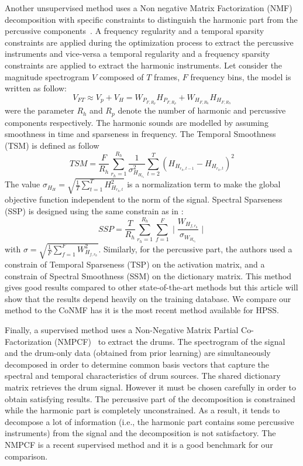 Another unsupervised method uses a Non negative Matrix Factorization (NMF) decomposition with specific constraints to distinguish the harmonic part from the percussive components~\cite{canadas2014percussive}. A frequency regularity and a temporal sparsity constraints are applied during the optimization process to extract the percussive instruments and vice-versa a temporal regularity and a frequency sparsity constraints are applied to extract the harmonic instruments. Let consider the magnitude spectrogram $V$ composed of $T$ frames, $F$ frequency bins, the model is written as follow:
$$ V_{FT} \approx V_p + V_H = W_{P_{F,R_p}} H_{P_{F,R_p}} + W_{H_{F,R_h}} H_{H_{F,R_h}} $$
were the parameter $R_h$ and $R_p$ denote the number of harmonic and percussive components respectively. The harmonic sounds are modelled by assuming smoothness in time and sparseness in frequency. The Temporal Smoothness (TSM) is defined as follow 
\begin{equation}\label{TSM}
TSM = \frac{F}{R_h} \sum_{r_h=1}^{R_h}\frac{1}{\sigma_{H_{H_{r_h}}}^2} \sum_{t=2}^{T}(H_{H_{r_h,t-1}} - H_{H_{r_h,t}})^2
\end{equation}
The value $\sigma_{H_{H}} = \sqrt{\frac{1}{T} \sum_{t=1}^{T} H_{H_{r_h,t}}^2 }$ is a normalization term to make the global objective function independent to the norm of the signal. Spectral Sparseness (SSP) is designed using the same constrain as in \cite{Virtanen}:
\begin{equation}\label{SSP}
SSP = \frac{T}{R_h} \sum_{r_h=1}^{R_h}\sum_{f=1}^{F} \mid\frac{W_{H_{f,r_h}}}{\sigma_{W_{H_{r_h}}}}\mid
\end{equation}
with $\sigma = \sqrt{\frac{1}{F} \sum_{f=1}^{F} W_{H_{f,r_h}}^2 }$.
Similarly, for the percussive part, the authors used a constrain of Temporal Sparseness (TSP) on the activation matrix, and a constrain of Spectral Smoothness (SSM) on the dictionary matrix. 
This method gives good results compared to other state-of-the-art methods but this article will show that the results depend heavily on the training database. We compare our method to the CoNMF has it is the most recent method available for HPSS.

Finally, a supervised method uses a Non-Negative Matrix Partial Co-Factorization (NMPCF)~\cite{kim2011nonnegative} to extract the drums. The spectrogram of the signal and the drum-only data (obtained from prior learning) are simultaneously decomposed in order to determine common basis vectors that capture the spectral and temporal characteristics of drum sources. The shared dictionary matrix retrieves the drum signal. However it must be chosen carefully in order to obtain satisfying results. The percussive part of the decomposition is constrained while the harmonic part is completely unconstrained. As a result, it tends to decompose a lot of information (i.e., the harmonic part contains some percussive instruments) from the signal and the decomposition is not satisfactory. The NMPCF is a recent supervised method and it is a good benchmark for our comparison.

